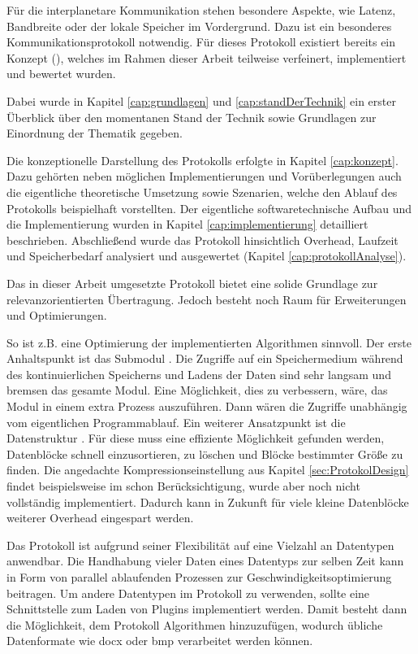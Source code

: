 Für die interplanetare Kommunikation stehen besondere Aspekte, wie Latenz,
Bandbreite oder der lokale Speicher im Vordergrund. Dazu ist ein besonderes
Kommunikationsprotokoll notwendig. Für dieses Protokoll existiert
bereits ein Konzept (\cite{Daher}), welches im Rahmen dieser Arbeit
teilweise verfeinert, implementiert und bewertet wurden.

Dabei wurde in Kapitel \ref{cap:grundlagen} und \ref{cap:standDerTechnik} ein
erster Überblick über den momentanen Stand der Technik sowie Grundlagen zur
Einordnung der Thematik gegeben.

Die konzeptionelle Darstellung des Protokolls erfolgte in Kapitel
\ref{cap:konzept}. Dazu gehörten neben möglichen Implementierungen und
Vorüberlegungen auch die eigentliche theoretische Umsetzung sowie Szenarien,
welche den Ablauf des Protokolls beispielhaft vorstellten. Der eigentliche
softwaretechnische Aufbau und die Implementierung wurden in Kapitel
\ref{cap:implementierung} detailliert beschrieben. Abschließend wurde das
Protokoll hinsichtlich Overhead, Laufzeit und Speicherbedarf analysiert und
ausgewertet (Kapitel \ref{cap:protokollAnalyse}).

Das in dieser Arbeit umgesetzte Protokoll bietet eine solide
Grundlage zur relevanzorientierten Übertragung. Jedoch besteht noch Raum
für Erweiterungen und Optimierungen.

So ist z.B. eine Optimierung der implementierten Algorithmen sinnvoll.
Der erste Anhaltspunkt ist das Submodul .
Die Zugriffe auf ein Speichermedium während des kontinuierlichen Speicherns und
Ladens der Daten sind sehr langsam und bremsen das gesamte Modul. Eine Möglichkeit, dies zu
verbessern, wäre, das Modul in einem extra Prozess auszuf{\"u}hren. Dann wären
die Zugriffe unabhängig vom eigentlichen Programmablauf. Ein weiterer
Ansatzpunkt ist die Datenstruktur . Für diese muss
eine effiziente Möglichkeit gefunden werden, Datenblöcke schnell einzusortieren,
zu löschen und Bl{\"o}cke bestimmter Größe zu finden.
Die angedachte Kompressionseinstellung aus Kapitel \ref{sec:ProtokolDesign}
findet beispielsweise im  schon Berücksichtigung, wurde aber
noch nicht vollständig implementiert. Dadurch kann in Zukunft für viele kleine
Datenblöcke weiterer Overhead eingespart werden.

Das Protokoll ist aufgrund seiner Flexibilität auf eine Vielzahl an Datentypen
anwendbar. Die Handhabung vieler Daten eines Datentyps zur selben Zeit kann
in Form von parallel ablaufenden Prozessen zur Geschwindigkeitsoptimierung
beitragen. Um andere Datentypen im Protokoll zu verwenden, sollte eine
Schnittstelle zum Laden von Plugins implementiert werden. Damit besteht dann die
Möglichkeit, dem Protokoll Algorithmen hinzuzufügen, wodurch
übliche Datenformate wie docx oder bmp verarbeitet werden können.

